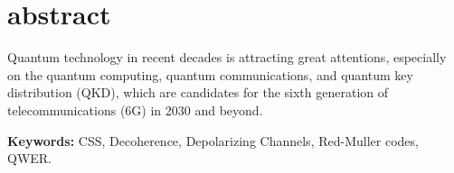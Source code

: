 
\chapter*{abstract}
\vspace*{-0.3cm}

\indent \indent 
Quantum technology in recent decades is attracting great attentions, especially on the quantum computing, quantum communications, and quantum key distribution (QKD), which are candidates for the sixth generation of telecommunications (6G) in 2030 and beyond.

\vspace{0.2in}
\noindent\textbf{Keywords:} CSS, Decoherence, Depolarizing Channels, Red-Muller codes, QWER.


\newpage